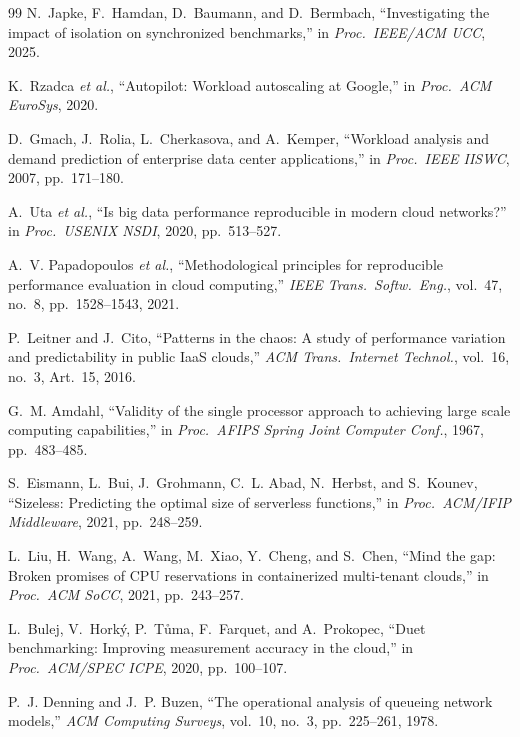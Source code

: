 \begin{thebibliography}{99}
N.~Japke, F.~Hamdan, D.~Baumann, and D.~Bermbach, ``Investigating the impact
of isolation on synchronized benchmarks,'' in \emph{Proc.\ IEEE/ACM UCC}, 2025.

K.~Rzadca \emph{et al.}, ``Autopilot: Workload autoscaling at Google,'' in
\emph{Proc.\ ACM EuroSys}, 2020.

D.~Gmach, J.~Rolia, L.~Cherkasova, and A.~Kemper, ``Workload analysis and
demand prediction of enterprise data center applications,'' in \emph{Proc.\
IEEE IISWC}, 2007, pp.\ 171--180.

A.~Uta \emph{et al.}, ``Is big data performance reproducible in modern cloud
networks?'' in \emph{Proc.\ USENIX NSDI}, 2020, pp.\ 513--527.

A.~V. Papadopoulos \emph{et al.}, ``Methodological principles for
reproducible performance evaluation in cloud computing,'' \emph{IEEE
Trans.\ Softw.\ Eng.}, vol.~47, no.~8, pp.\ 1528--1543, 2021.

P.~Leitner and J.~Cito, ``Patterns in the chaos: A study of performance
variation and predictability in public IaaS clouds,'' \emph{ACM Trans.\
Internet Technol.}, vol.~16, no.~3, Art.~15, 2016.

G.~M. Amdahl, ``Validity of the single processor approach to achieving large
scale computing capabilities,'' in \emph{Proc.\ AFIPS Spring Joint Computer
Conf.}, 1967, pp.\ 483--485.

S.~Eismann, L.~Bui, J.~Grohmann, C.~L. Abad, N.~Herbst, and S.~Kounev,
``Sizeless: Predicting the optimal size of serverless functions,'' in
\emph{Proc.\ ACM/IFIP Middleware}, 2021, pp.\ 248--259.

L.~Liu, H.~Wang, A.~Wang, M.~Xiao, Y.~Cheng, and S.~Chen, ``Mind the gap:
Broken promises of CPU reservations in containerized multi-tenant
clouds,'' in \emph{Proc.\ ACM SoCC}, 2021, pp.\ 243--257.

L.~Bulej, V.~Horký, P.~Tůma, F.~Farquet, and A.~Prokopec, ``Duet
benchmarking: Improving measurement accuracy in the cloud,'' in
\emph{Proc.\ ACM/SPEC ICPE}, 2020, pp.\ 100--107.

P.~J. Denning and J.~P. Buzen, ``The operational analysis of queueing
network models,'' \emph{ACM Computing Surveys}, vol.~10, no.~3,
pp.\ 225--261, 1978.

\end{thebibliography}
